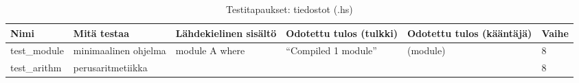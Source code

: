 \documentclass[11pt]{article} %
\begin{document}
\begin{table}[!htbp] %
\caption{Testitapaukset: tiedostot (.hs)}
\begin{tabular}{|p{}|p{}|p{}|p{2cm}|p{3cm}|p{}|}
\hline
\textbf{Nimi} & \textbf{Mitä testaa} & \textbf{Lähdekielinen sisältö} & \textbf{Odotettu tulos (tulkki)} & \textbf{Odotettu tulos (kääntäjä)} & \textbf{Vaihe} \\ \hline
test\_module  &  minimaalinen ohjelma  & module A where &  ``Compiled 1 module''    &    (module)    & 8   \\ \hline
 test\_arithm     & perus\-aritmetiikka         &  &                                  &                                   &   8       \\ \hline


\end{tabular}
\end{table}
\end{document}
